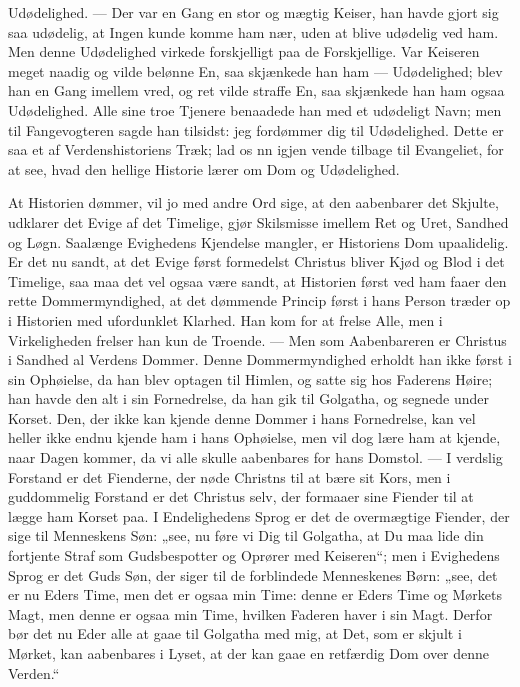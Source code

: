 \documentclass[12pt,a4paper]{book}
\begin{document}
Udødelighed. --- Der var en Gang en stor og mægtig Keiser, han havde gjort sig saa
udødelig, at Ingen kunde komme ham nær, uden at blive udødelig ved ham. Men denne
Udødelighed virkede forskjelligt paa de Forskjellige. Var Keiseren meget naadig og vilde
belønne En,
saa skjænkede han ham --- Udødelighed; blev han en Gang imellem vred, og ret vilde
straffe En, saa skjænkede han ham ogsaa Udødelighed. Alle sine troe Tjenere benaadede
han med et udødeligt Navn; men til Fangevogteren sagde han tilsidst: jeg fordømmer dig
til Udødelighed. Dette er saa et af Verdenshistoriens Træk; lad os nn igjen vende
tilbage til Evangeliet, for at see, hvad den hellige Historie lærer om Dom og
Udødelighed.

At Historien dømmer, vil jo med andre Ord sige, at den aabenbarer det Skjulte, udklarer
det Evige af det Timelige, gjør Skilsmisse imellem Ret og Uret, Sandhed og Løgn.
Saalænge Evighedens Kjendelse mangler, er Historiens Dom upaalidelig. Er det nu sandt,
at det Evige først formedelst Christus bliver Kjød og Blod i det Timelige, saa maa det
vel ogsaa være sandt, at Historien først ved ham faaer den rette Dommermyndighed, at det
dømmende Princip først i hans Person træder op i Historien med ufordunklet Klarhed. Han
kom for at frelse Alle, men i Virkeligheden frelser han kun de Troende. --- Men som
Aabenbareren er Christus i Sandhed al Verdens Dommer. Denne Dommermyndighed erholdt han
ikke først i sin Ophøielse, da han blev optagen til Himlen, og satte sig hos Faderens
Høire; han havde den alt i sin Fornedrelse, da han gik til Golgatha, og segnede under
Korset. Den, der ikke kan kjende denne Dommer i hans Fornedrelse, kan vel heller ikke
endnu kjende ham i hans Ophøielse, men vil dog lære ham at kjende, naar Dagen kommer, da
vi alle skulle aabenbares for hans Domstol. --- I verdslig Forstand er det Fienderne,
der nøde Christns til at bære sit Kors, men i guddommelig Forstand er det Christus selv,
der formaaer sine Fiender til at lægge ham Korset paa. I Endelighedens Sprog er det de
overmægtige Fiender, der sige til Menneskens Søn: „see, nu føre vi Dig til Golgatha, at
Du maa lide din fortjente Straf som Gudsbespotter
og Oprører med Keiseren“; men i Evighedens Sprog er det Guds Søn, der siger til de
forblindede Menneskenes Børn: „see, det er nu Eders Time, men det er ogsaa min Time:
denne er Eders Time og Mørkets Magt, men denne er ogsaa min Time, hvilken Faderen haver
i sin Magt. Derfor bør det nu Eder alle at gaae til Golgatha med mig, at Det, som er
skjult i Mørket, kan aabenbares i Lyset, at der kan gaae en retfærdig Dom over denne
Verden.“
\end{document}
